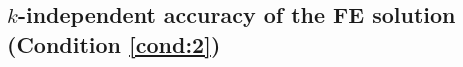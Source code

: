 











\subsection{$k$-independent accuracy of the FE solution (Condition \ref{cond:2})}\label{sec:cond2}

